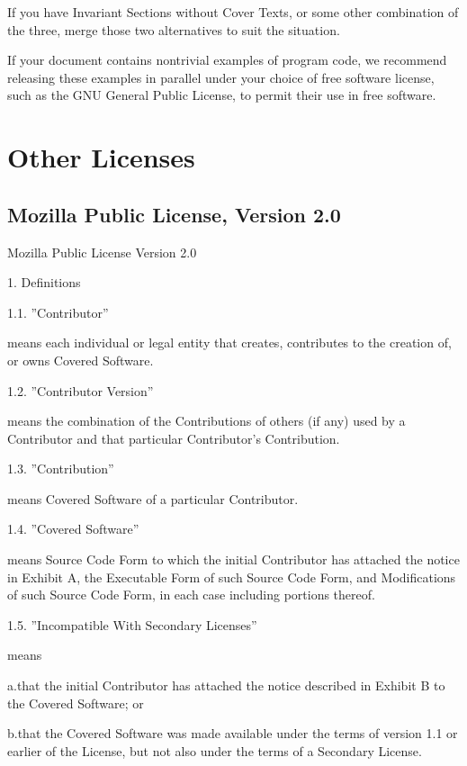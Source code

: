 If you have Invariant Sections without Cover Texts, or some other combination of the three, merge those two alternatives to suit the situation.

If your document contains nontrivial examples of program code, we recommend releasing these examples in parallel under your choice of free software license, such as the GNU General Public License, to permit their use in free software. 






\newpage
\section{Other Licenses}
\subsection{Mozilla Public License, Version 2.0}
\label{MPL2}
\begin{center}
	Mozilla Public License
	Version 2.0
\end{center}


1. Definitions

1.1. ''Contributor''

means each individual or legal entity that creates, contributes to the creation of, or owns Covered Software.

1.2. ''Contributor Version''

means the combination of the Contributions of others (if any) used by a Contributor and that particular Contributor’s Contribution.

1.3. ''Contribution''

means Covered Software of a particular Contributor.

1.4. ''Covered Software''

means Source Code Form to which the initial Contributor has attached the notice in Exhibit A, the Executable Form of such Source Code Form, and Modifications of such Source Code Form, in each case including portions thereof.

1.5. ''Incompatible With Secondary Licenses''

means

a.that the initial Contributor has attached the notice described in Exhibit B to the Covered Software; or

b.that the Covered Software was made available under the terms of version 1.1 or earlier of the License, but not also under the terms of a Secondary License.

